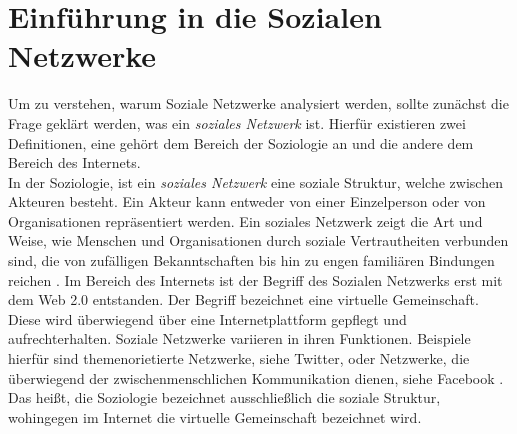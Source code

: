\chapter{Einführung in die Sozialen Netzwerke}\label{ch:SNA}
Um zu verstehen, warum Soziale Netzwerke analysiert werden, sollte zunächst die Frage geklärt werden, was ein \textit{soziales Netzwerk} ist. Hierfür existieren zwei Definitionen, eine gehört dem Bereich der Soziologie an und die andere dem Bereich des Internets. \\
In der Soziologie, ist ein \textit{soziales Netzwerk} eine soziale Struktur, welche zwischen Akteuren besteht. Ein Akteur kann entweder von einer Einzelperson oder  von Organisationen repräsentiert werden. Ein soziales Netzwerk zeigt die Art und Weise, wie Menschen und Organisationen durch soziale Vertrautheiten verbunden sind, die von zufälligen Bekanntschaften bis hin zu engen familiären Bindungen reichen \cite{SNADefinition}. Im Bereich des Internets ist der Begriff des Sozialen Netzwerks erst mit dem Web 2.0 entstanden. Der Begriff bezeichnet eine virtuelle Gemeinschaft. Diese wird überwiegend über eine Internetplattform gepflegt und aufrechterhalten. Soziale Netzwerke variieren in ihren Funktionen. Beispiele hierfür sind themenorietierte Netzwerke, siehe Twitter, oder Netzwerke, die überwiegend der zwischenmenschlichen Kommunikation dienen, siehe Facebook \cite{SNAWeb2.0}. Das heißt, die Soziologie bezeichnet ausschließlich die soziale Struktur, wohingegen im Internet die virtuelle Gemeinschaft bezeichnet wird.

